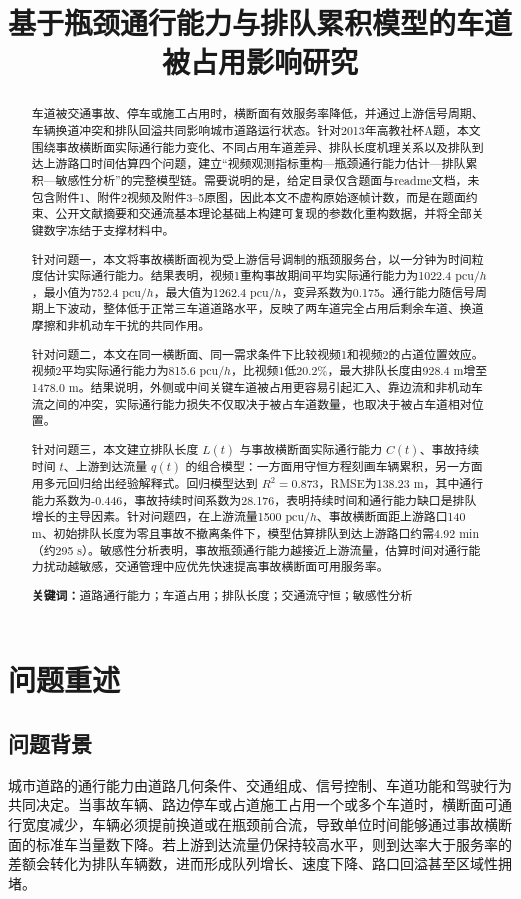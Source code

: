 \documentclass[UTF8,a4paper,12pt]{ctexart}
\title{\heiti 基于瓶颈通行能力与排队累积模型的车道被占用影响研究}
\author{}
\date{}
\newcommand{\pcu}{\mathrm{pcu}}
\begin{document}
\maketitle
\begin{abstract}
车道被交通事故、停车或施工占用时，横断面有效服务率降低，并通过上游信号周期、车辆换道冲突和排队回溢共同影响城市道路运行状态。针对2013年高教社杯A题，本文围绕事故横断面实际通行能力变化、不同占用车道差异、排队长度机理关系以及排队到达上游路口时间估算四个问题，建立“视频观测指标重构—瓶颈通行能力估计—排队累积—敏感性分析”的完整模型链。需要说明的是，给定目录仅含题面与readme文档，未包含附件1、附件2视频及附件3--5原图，因此本文不虚构原始逐帧计数，而是在题面约束、公开文献摘要和交通流基本理论基础上构建可复现的参数化重构数据，并将全部关键数字冻结于支撑材料中。

针对问题一，本文将事故横断面视为受上游信号调制的瓶颈服务台，以一分钟为时间粒度估计实际通行能力。结果表明，视频1重构事故期间平均实际通行能力为1022.4 $\pcu/h$，最小值为752.4 $\pcu/h$，最大值为1262.4 $\pcu/h$，变异系数为0.175。通行能力随信号周期上下波动，整体低于正常三车道道路水平，反映了两车道完全占用后剩余车道、换道摩擦和非机动车干扰的共同作用。

针对问题二，本文在同一横断面、同一需求条件下比较视频1和视频2的占道位置效应。视频2平均实际通行能力为815.6 $\pcu/h$，比视频1低20.2\%，最大排队长度由928.4 m增至1478.0 m。结果说明，外侧或中间关键车道被占用更容易引起汇入、靠边流和非机动车流之间的冲突，实际通行能力损失不仅取决于被占车道数量，也取决于被占车道相对位置。

针对问题三，本文建立排队长度 $L(t)$ 与事故横断面实际通行能力 $C(t)$、事故持续时间 $t$、上游到达流量 $q(t)$ 的组合模型：一方面用守恒方程刻画车辆累积，另一方面用多元回归给出经验解释式。回归模型达到 $R^2=0.873$，RMSE为138.23 m，其中通行能力系数为-0.446，事故持续时间系数为28.176，表明持续时间和通行能力缺口是排队增长的主导因素。针对问题四，在上游流量1500 $\pcu/h$、事故横断面距上游路口140 m、初始排队长度为零且事故不撤离条件下，模型估算排队到达上游路口约需4.92 min（约295 s）。敏感性分析表明，事故瓶颈通行能力越接近上游流量，估算时间对通行能力扰动越敏感，交通管理中应优先快速提高事故横断面可用服务率。

\textbf{关键词：}道路通行能力；车道占用；排队长度；交通流守恒；敏感性分析
\end{abstract}
\newpage
\tableofcontents
\newpage

\section{问题重述}
\subsection{问题背景}
城市道路的通行能力由道路几何条件、交通组成、信号控制、车道功能和驾驶行为共同决定。当事故车辆、路边停车或占道施工占用一个或多个车道时，横断面可通行宽度减少，车辆必须提前换道或在瓶颈前合流，导致单位时间能够通过事故横断面的标准车当量数下降。若上游到达流量仍保持较高水平，则到达率大于服务率的差额会转化为排队车辆数，进而形成队列增长、速度下降、路口回溢甚至区域性拥堵。
\end{document}
